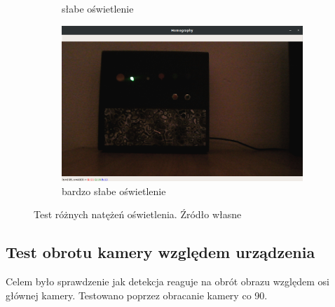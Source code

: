 \documentclass[12pt,twoside,polish]{article}
\begin{document}
\begin{figure}[htb!]
\begin{subfigure}[b]{0.5\textwidth}
		\caption{słabe oświetlenie}
		\label{test_bright2}
	\end{subfigure}
	\begin{subfigure}[b]{0.5\textwidth}
		\includegraphics[width=\textwidth]{test_bright2}
		\caption{bardzo słabe oświetlenie}
		\label{test_bright3}
	\end{subfigure}
	\caption{Test różnych natężeń oświetlenia. Źródło własne}
\end{figure}
\FloatBarrier

\subsection{Test obrotu kamery względem urządzenia}
Celem było sprawdzenie jak detekcja reaguje na obrót obrazu względem osi głównej kamery. Testowano poprzez obracanie kamery co 90\degree.
\end{document}
